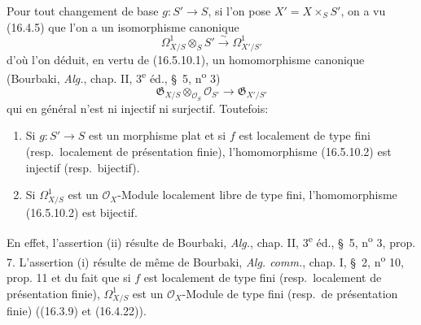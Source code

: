 \begin{env}[16.5.10]
\label{IV.16.5.10}
Pour tout changement de base $g:S'\to S$, si l'on pose $X'=X\times_S S'$, on
a vu (16.4.5) que l'on a un isomorphisme canonique
\[
  \Omega_{X/S}^1\otimes_S S'\xrightarrow{\sim}\Omega_{X'/S'}^1
  \tag{16.5.10.1}
  \label{IV.16.5.10.1}
\]
d'où l'on déduit, en vertu de (16.5.10.1), un homomorphisme canonique
(Bourbaki, \emph{Alg.}, chap. II, 3\textsuperscript{e} éd., \S~5,
n\textsuperscript{o} 3)
\[
  \mathfrak{G}_{X/S}\otimes_{\mathcal{O}_S}\mathcal{O}_{S'}
  \longrightarrow\mathfrak{G}_{X'/S'}
  \tag{16.5.10.2}
  \label{IV.16.5.10.2}
\]
qui en général n'est ni injectif ni surjectif. Toutefois:
\end{env}

\begin{proposition}[16.5.11]
\label{IV.16.5.11}
\begin{enumerate}
\item[(i)] Si $g:S'\to S$ est un morphisme plat et si $f$ est localement de
type fini (resp.\ localement de présentation finie), l'homomorphisme
(16.5.10.2) est injectif (resp.\ bijectif).
\item[(ii)] Si $\Omega_{X/S}^1$ est un $\mathcal{O}_X$-Module localement libre
de type fini, l'homomorphisme (16.5.10.2) est bijectif.
\end{enumerate}
\end{proposition}

En effet, l'assertion (ii) résulte de Bourbaki, \emph{Alg.}, chap. II,
3\textsuperscript{e} éd., \S~5, n\textsuperscript{o} 3, prop. 7. L'assertion
(i) résulte de même de Bourbaki, \emph{Alg. comm.}, chap. I, \S~2,
n\textsuperscript{o} 10, prop. 11 et du fait que si $f$ est localement de type
fini (resp.\ localement de présentation finie), $\Omega_{X/S}^1$ est un
$\mathcal{O}_X$-Module de type fini (resp.\ de présentation finie) ((16.3.9)
et (16.4.22)).

